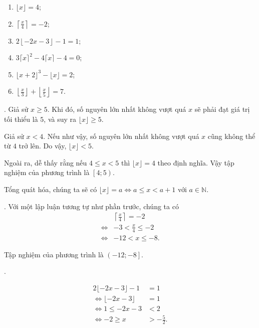 \begin{multicols}{2}
   \begin{enumerate}
      \item $\lfloor x \rfloor = 4$;
      \item $\left\lceil \frac{x}{4} \right\rceil = -2$;
      \item $2\left\lfloor -2x - 3 \right\rfloor - 1 = 1$;
      \item $3\lceil x \rceil^2 - 4\lceil x \rceil - 4 = 0$;
      \item $\lfloor x + 2 \rfloor^3 - \lfloor x \rfloor = 2$;
      \item $\left\lfloor \frac{x}{3} \right\rfloor + \left\lfloor \frac{x}{5} \right\rfloor = 7$. 
   \end{enumerate}
\end{multicols}

\solution

\setcounter{subexercise}{1}
. Giả sử $x \geq 5$. Khi đó, số nguyên lớn nhất không vượt quá $x$ sẽ phải đạt giá trị tối thiểu là $5$, và suy ra $\lfloor x \rfloor \geq 5$.

Giả sử $x < 4$. Nếu như vậy, số nguyên lớn nhất không vượt quá $x$ cũng không thể từ $4$ trở lên. Do vậy, $\lfloor x \rfloor < 5$. 

Ngoài ra, dễ thấy rằng nếu $4 \leq x < 5$ thì $\lfloor x \rfloor = 4$ theo định nghĩa. Vậy tập nghiệm của phương trình là $\left[4; 5\right)$.

Tổng quát hóa, chúng ta sẽ có $\lfloor x \rfloor = a \iff a \leq x < a + 1$ với $a \in \mathbb{N}$.

. Với một lập luận tương tự như phần trước, chúng ta có
\begin{align*}
   &\left\lceil \frac{x}{4} \right\rceil = -2 \\
   \iff &-3 < \frac{x}{4} \leq -2 \\
   \iff &-12 < x \leq -8.
\end{align*}

Tập nghiệm của phương trình là $\left(-12; -8\right]$.

. 

\begin{align*}
   2\lfloor -2x - 3 \rfloor - 1 &= 1 \\
   \iff \lfloor -2x - 3 \rfloor &= 1 \\
   \iff 1 \leq -2x - 3 &< 2 \\
   \iff -2 \geq x &> -\frac{5}{2}.
\end{align*}

